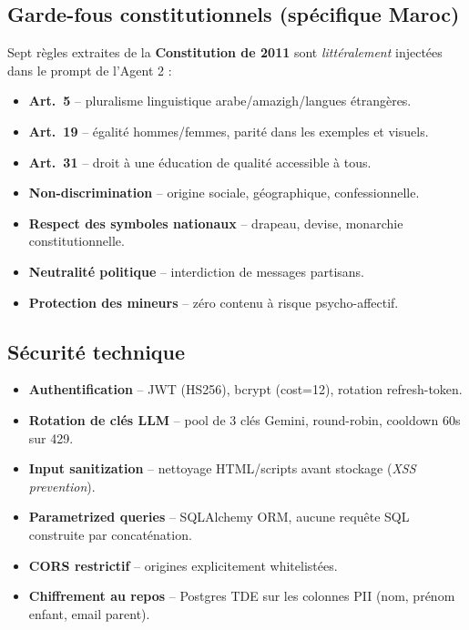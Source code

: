 \documentclass[11pt,a4paper]{article}
\begin{document}
\subsection{Garde-fous constitutionnels (spécifique Maroc)}

Sept règles extraites de la \textbf{Constitution de 2011} sont \emph{littéralement}
injectées dans le prompt de l'Agent 2 :

\begin{itemize}
\item \textbf{Art.\ 5} -- pluralisme linguistique arabe/amazigh/langues étrangères.
\item \textbf{Art.\ 19} -- égalité hommes/femmes, parité dans les exemples et visuels.
\item \textbf{Art.\ 31} -- droit à une éducation de qualité accessible à tous.
\item \textbf{Non-discrimination} -- origine sociale, géographique, confessionnelle.
\item \textbf{Respect des symboles nationaux} -- drapeau, devise, monarchie constitutionnelle.
\item \textbf{Neutralité politique} -- interdiction de messages partisans.
\item \textbf{Protection des mineurs} -- zéro contenu à risque psycho-affectif.
\end{itemize}

\subsection{Sécurité technique}

\begin{itemize}
\item \textbf{Authentification} -- JWT (HS256), bcrypt (cost=12), rotation refresh-token.
\item \textbf{Rotation de clés LLM} -- pool de 3 clés Gemini, round-robin, cooldown 60s sur 429.
\item \textbf{Input sanitization} -- nettoyage HTML/scripts avant stockage (\textit{XSS prevention}).
\item \textbf{Parametrized queries} -- SQLAlchemy ORM, aucune requête SQL construite par concaténation.
\item \textbf{CORS restrictif} -- origines explicitement whitelistées.
\item \textbf{Chiffrement au repos} -- Postgres TDE sur les colonnes PII (nom, prénom enfant, email parent).
\end{itemize}
\end{document}
